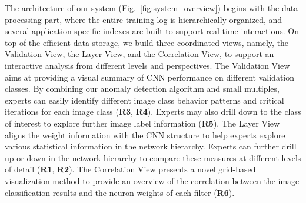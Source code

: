 \documentclass[format=acmsmall, review=false, screen=true]{acmart}
\begin{document}
The architecture of our system (Fig.~\ref{fig:system_overview}) begins with the data processing part, where the entire training log is hierarchically organized, and several application-specific indexes are built to support real-time interactions.
On top of the efficient data storage, we build three coordinated views, namely, the Validation View, the Layer View, and the Correlation View, to support an interactive analysis from different levels and perspectives.
The Validation View aims at providing a visual summary of CNN performance on different validation classes.
By combining our anomaly detection algorithm and small multiples, experts can easily identify different image class behavior patterns and critical iterations for each image class (\textbf{R3}, \textbf{R4}).
Experts may also drill down to the class of interest to explore further image label information (\textbf{R5}).
The Layer View aligns the weight information with the CNN structure to help experts explore various statistical information in the network hierarchy.
Experts can further drill up or down in the network hierarchy to compare these measures at different levels of detail (\textbf{R1}, \textbf{R2}).
The Correlation View presents a novel grid-based visualization method to provide an overview of the correlation between the image classification results and the neuron weights of each filter (\textbf{R6}).
\end{document}
